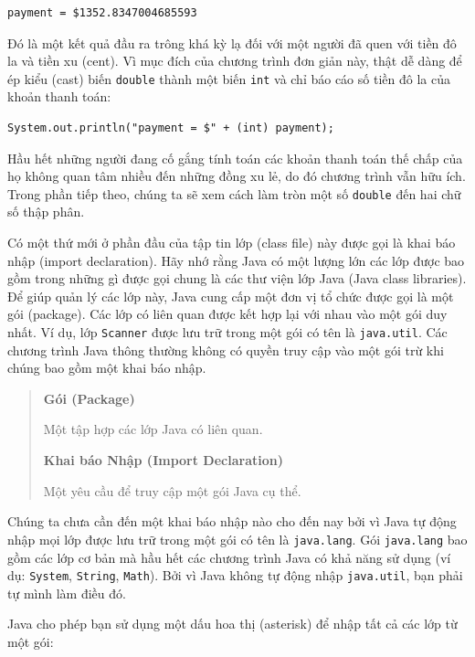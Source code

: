 \begin{verbatim}
payment = $1352.8347004685593
\end{verbatim}

Đó là một kết quả đầu ra trông khá kỳ lạ đối với một người đã quen với
tiền đô la và tiền xu (cent). Vì mục đích của chương trình đơn giản này,
thật dễ dàng để ép kiểu (cast) biến \texttt{double} thành một biến
\texttt{int} và chỉ báo cáo số tiền đô la của khoản thanh toán:

\begin{verbatim}
System.out.println("payment = $" + (int) payment);
\end{verbatim}

Hầu hết những người đang cố gắng tính toán các khoản thanh toán thế chấp
của họ không quan tâm nhiều đến những đồng xu lẻ, do đó chương trình vẫn
hữu ích. Trong phần tiếp theo, chúng ta sẽ xem cách làm tròn một số
\texttt{double} đến hai chữ số thập phân.

Có một thứ mới ở phần đầu của tập tin lớp (class file) này được gọi là
khai báo nhập (import declaration). Hãy nhớ rằng Java có một lượng lớn
các lớp được bao gồm trong những gì được gọi chung là các thư viện lớp
Java (Java class libraries). Để giúp quản lý các lớp này, Java cung cấp
một đơn vị tổ chức được gọi là một gói (package). Các lớp có liên quan
được kết hợp lại với nhau vào một gói duy nhất. Ví dụ, lớp
\texttt{Scanner} được lưu trữ trong một gói có tên là
\texttt{java.util}. Các chương trình Java thông thường không có quyền
truy cập vào một gói trừ khi chúng bao gồm một khai báo nhập.

\begin{quote}
\textbf{Gói (Package)}

Một tập hợp các lớp Java có liên quan.

\textbf{Khai báo Nhập (Import Declaration)}

Một yêu cầu để truy cập một gói Java cụ thể.
\end{quote}

Chúng ta chưa cần đến một khai báo nhập nào cho đến nay bởi vì Java tự
động nhập mọi lớp được lưu trữ trong một gói có tên là
\texttt{java.lang}. Gói \texttt{java.lang} bao gồm các lớp cơ bản mà hầu
hết các chương trình Java có khả năng sử dụng (ví dụ: \texttt{System},
\texttt{String}, \texttt{Math}). Bởi vì Java không tự động nhập
\texttt{java.util}, bạn phải tự mình làm điều đó.

Java cho phép bạn sử dụng một dấu hoa thị (asterisk) để nhập tất cả các
lớp từ một gói:

